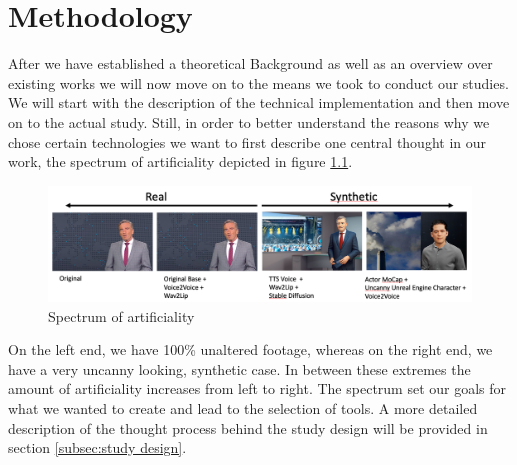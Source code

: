 \documentclass[
  a4paper,  %
  twoside,  %
  bibliography=totoc,
  headsepline,
  cleardoublepage=empty,
  parskip=half,
  draft=false
]{scrbook}
\begin{document}
\chapter{Methodology}
After we have established a theoretical Background as well as an overview over existing works we will now move on to the means we took to conduct our studies. We will start with the description of the technical implementation and then move on to the actual study. Still, in order to better understand the reasons why we chose certain technologies we want to first describe one central thought in our work, the spectrum of artificiality depicted in figure \ref{fig:spectrum}.
\begin{figure}[h]
  \centering
  \includegraphics[width=1\textwidth]{./graphics/images/spectrum-art.png}
  \caption{Spectrum of artificiality}
  \label{fig:spectrum}
\end{figure}
On the left end, we have 100\% unaltered footage, whereas on the right end, we have a very uncanny looking, synthetic case. In between these extremes the amount of artificiality increases from left to right. The spectrum set our goals for what we wanted to create and lead to the selection of tools. A more detailed description of the thought process behind the study design will be provided in section \ref{subsec:study design}. 
\end{document}
